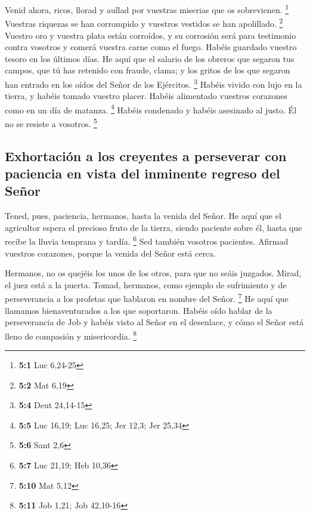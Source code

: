  Venid ahora, ricos, llorad y aullad por vuestras miserias
que os sobrevienen. \footnote{\textbf{5:1} Luc 6,24-25} 
Vuestras riquezas se han corrompido y vuestros vestidos se han
apolillado. \footnote{\textbf{5:2} Mat 6,19}  Vuestro oro
y vuestra plata están corroídos, y su corrosión será para testimonio
contra vosotros y comerá vuestra carne como el fuego. Habéis guardado
vuestro tesoro en los últimos días.  He aquí que el
salario de los obreros que segaron tus campos, que tú has retenido con
fraude, clama; y los gritos de los que segaron han entrado en los oídos
del Señor de los Ejércitos. \footnote{\textbf{5:4} Deut 24,14-15}
 Habéis vivido con lujo en la tierra, y habéis tomado
vuestro placer. Habéis alimentado vuestros corazones como en un día de
matanza. \footnote{\textbf{5:5} Luc 16,19; Luc 16,25; Jer 12,3; Jer
  25,34}  Habéis condenado y habéis asesinado al justo. Él
no se resiste a vosotros. \footnote{\textbf{5:6} Sant 2,6}

\hypertarget{exhortaciuxf3n-a-los-creyentes-a-perseverar-con-paciencia-en-vista-del-inminente-regreso-del-seuxf1or}{%
\subsection{Exhortación a los creyentes a perseverar con paciencia en
vista del inminente regreso del
Señor}\label{exhortaciuxf3n-a-los-creyentes-a-perseverar-con-paciencia-en-vista-del-inminente-regreso-del-seuxf1or}}

 Tened, pues, paciencia, hermanos, hasta la venida del
Señor. He aquí que el agricultor espera el precioso fruto de la tierra,
siendo paciente sobre él, hasta que recibe la lluvia temprana y tardía.
\footnote{\textbf{5:7} Luc 21,19; Heb 10,36}  Sed también
vosotros pacientes. Afirmad vuestros corazones, porque la venida del
Señor está cerca.

 Hermanos, no os quejéis los unos de los otros, para que
no seáis juzgados. Mirad, el juez está a la puerta. 
Tomad, hermanos, como ejemplo de sufrimiento y de perseverancia a los
profetas que hablaron en nombre del Señor. \footnote{\textbf{5:10} Mat
  5,12}  He aquí que llamamos bienaventurados a los que
soportaron. Habéis oído hablar de la perseverancia de Job y habéis visto
al Señor en el desenlace, y cómo el Señor está lleno de compasión y
misericordia. \footnote{\textbf{5:11} Job 1,21; Job 42,10-16}

